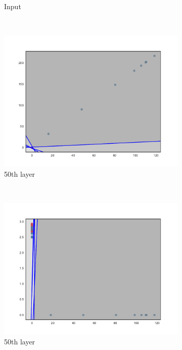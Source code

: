 \begin{figure}
\begin{subfigure}[b]{0.3\textwidth}
        \caption{\SepUnitPoint Input}
        \label{fig:unitpointInitInput}
    \end{subfigure}
    ~ %
    \begin{subfigure}[b]{0.3\textwidth}
        \includegraphics[width=\textwidth]{img/init/unitpointwise/conv2d_50-0.pdf}
        \caption{\SepUnitPoint 50th layer}
        \label{fig:unitpointInit501}
    \end{subfigure}
    ~ %
    \begin{subfigure}[b]{0.3\textwidth}
        \includegraphics[width=\textwidth]{img/init/unitpointwise/conv2d_50-2.pdf}
        \caption{\SepUnitPoint 50th layer}
        \label{fig:unitpointInit502}
    \end{subfigure}
    
  \caption{} 
  \label{fig:init} 
\end{figure}





